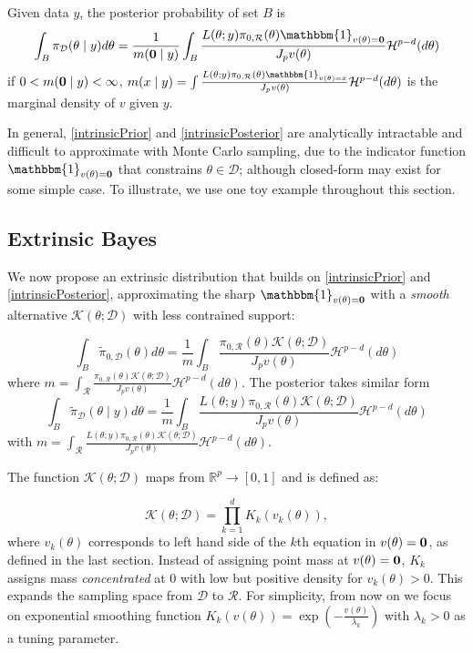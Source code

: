 \documentclass[10pt]{article}
\newcommand{\bb}[1]{\mathbb{#1}}
\newcommand{\mc}[1]{\mathcal{#1}}
\DeclareMathOperator{\1}{\mathbbm{1}}
\begin{document}
Given data $y$, the posterior probability of set $B$ is
\begin{equation}
\label{intrinsicPosterior}
	\int_{B}\pi_{\mc D}(\theta \mid y)d\theta= \frac{1}{m({\bf 0} \mid y)}\int_{B} \frac{L(\theta;y)\pi_{0,\mc R}(\theta) \mathbbm{1}_{v({\theta})={\bf 0}}}{J_p v(\theta)}\mc H^{p-d}(d\theta)
\end{equation}
if $0<m({\bf 0} \mid y)<\infty$, $m(x\mid y)= \int \frac{L(\theta;y)\pi_{0,\mc R}(\theta)\mathbbm{1}_{v({\theta})=x}}{J_p v(\theta)}\mc H^{p-d}(d\theta)$ is the marginal density of $v$ given $y$.

In general, \eqref{intrinsicPrior} and \eqref{intrinsicPosterior} are analytically intractable and difficult to approximate with Monte Carlo sampling, due to the indicator function $\mathbbm{1}_{v({\theta})={\bf 0}}$ that constrains $\theta\in \mc D$; although closed-form may exist for some simple case. To illustrate, we use one toy example throughout this section.


\subsection{Extrinsic Bayes}
We now propose an extrinsic distribution that builds on \eqref{intrinsicPrior} and \eqref{intrinsicPosterior}, approximating the sharp $\mathbbm{1}_{v(\theta)= \bf 0}$ with a {\em smooth} alternative $\mc{K}( \theta; \mc D)$ with less contrained support:


\begin{equation}
\label{extrinsicPrior}
	\int_{B}\tilde \pi_{0,\mc D}(\theta)d\theta= \frac{1}{m}\int_{B} \frac{\pi_{0,\mc R}(\theta) \mc{K}( \theta; \mc D)   }{J_p v(\theta)}\mc H^{p-d}(d\theta)
\end{equation}
where $m=\int_{\mc R} \frac{\pi_{0,\mc R}(\theta) \mc{K}( \theta; \mc D)   }{J_p v(\theta)}\mc H^{p-d}(d\theta)$. The posterior takes similar form
\begin{equation}
\label{extrinsicPosterior}
	\int_{B}\tilde \pi_{\mc D}(\theta \mid y)d\theta= \frac{1}{m}\int_{B} \frac{L(\theta;y)\pi_{0,\mc R}(\theta) \mc{K}( \theta; \mc D)   }{J_p v(\theta)}\mc H^{p-d}(d\theta)
\end{equation}
with $m=	\int_{\mc R} \frac{L(\theta;y)\pi_{0,\mc R}(\theta) \mc{K}( \theta; \mc D)   }{J_p v(\theta)}\mc H^{p-d}(d\theta)$.
 
The function $\mc K(\theta;\mc D)$ maps from $\bb R^p\rightarrow [0,1]$ and is defined as:

\begin{equation}
\label{smoothing}
\mc K(\theta; \mc D)= \prod_{k=1}^d K_k(v_k(\theta)),
\end{equation}
where $v_k(\theta)$ corresponds to left hand side of the $k$th equation in $v(\theta)=\bf 0$, as defined in the last section. Instead of assigning point mass at $v(\theta)=\bf 0$, $K_k$ assigns mass {\it concentrated} at $0$ with low but positive density for ${v_k(\theta)>0}$. This expands the sampling space from $\mc D$ to $\mc R$. For simplicity, from now on we focus on exponential smoothing function $K_k(v(\theta))=\exp(-\frac{v(\theta)}{\lambda_k})$ with $\lambda_k>0$ as a tuning parameter.
\end{document}
